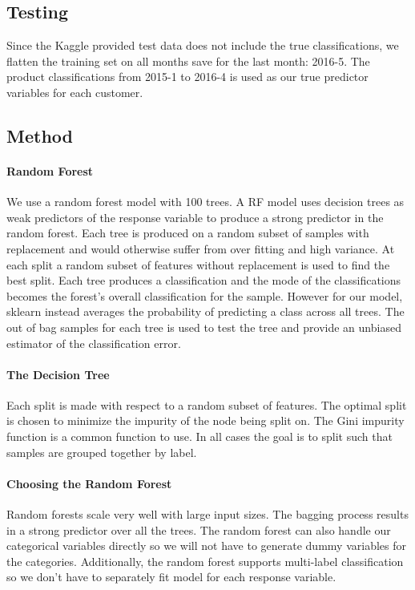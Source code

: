 \documentclass{article}
\begin{document}
\begin{spacing}{1}
\begin{large}
\subsection{Testing}
Since the Kaggle provided test data does not include the true classifications, we flatten the training set on all months save for the last month: 2016-5. The product classifications from 2015-1 to 2016-4 is used as our true predictor variables for each customer.

\subsection{Method}

\paragraph{Random Forest}
We use a random forest model with 100 trees. A RF model uses decision trees as weak predictors of the response variable to produce a strong predictor in the random forest. Each tree is produced on a random subset of samples with replacement and would otherwise suffer from over fitting and high variance. At each split a random subset of features without replacement is used to find the best split. Each tree produces a classification and the mode of the classifications becomes the forest's overall classification for the sample. However for our model, sklearn instead averages the probability of predicting a class across all trees.\cite{rnSKlearn}  The out of bag samples for each tree is used to test the tree and provide an unbiased estimator of the classification error.\cite{rnLeo}

\paragraph{The Decision Tree}
Each split is made with respect to a random subset of features. The optimal split is chosen to minimize the impurity of the node being split on. The Gini impurity function is a common function to use. In all cases the goal is to split such that samples are grouped together by label.

\paragraph{Choosing the Random Forest}

Random forests scale very well with large input sizes. The bagging process results in a strong predictor over all the trees. The random forest can also handle our categorical variables directly so we will not have to generate dummy variables for the categories. Additionally, the random forest supports multi-label classification so we don't have to separately fit model for each response variable.


\end{large}
\end{spacing}
\end{document}
